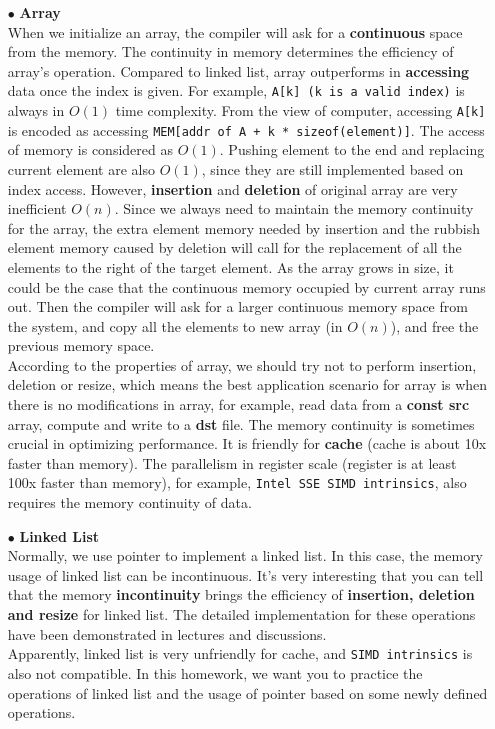 \documentclass[10.5pt]{article}
\begin{document}
\begin{enumerate}
	\item[$\bullet$] \textbf{Array}\\
	When we initialize an array, the compiler will ask for a \textbf{continuous} space from the memory. The continuity in memory determines the efficiency of array's operation. Compared to linked list, array outperforms in \textbf{accessing} data once the index is given. For example, \texttt{A[k] (k is a valid index)} is always in $O(1)$ time complexity. From the view of computer, accessing \texttt{A[k]} is encoded as accessing \texttt{MEM[addr of A + k * sizeof(element)]}. The access of memory is considered as $O(1)$. Pushing element to the end and replacing current element are also $O(1)$, since they are still implemented based on index access. However, \textbf{insertion} and \textbf{deletion} of original array are very inefficient $O(n)$. Since we always need to maintain the memory continuity for the array, the extra element memory needed by insertion and the rubbish element memory caused by deletion will call for the replacement of all the elements to the right of the target element. As the array grows in size, it could be the case that the continuous memory occupied by current array runs out. Then the compiler will ask for a larger continuous memory space from the system, and copy all the elements to new array (in $O(n)$), and free the previous memory space.\\
	
	According to the properties of array, we should try not to perform insertion, deletion or resize, which means the best application scenario for array is when there is no modifications in array, for example, read data from a \textbf{const src} array, compute and write to a \textbf {dst} file. The memory continuity is sometimes crucial in optimizing performance. It is friendly for \textbf{cache} (cache is about 10x faster than memory). The parallelism in register scale (register is at least 100x faster than memory), for example, \texttt{Intel SSE SIMD intrinsics}, also requires the memory continuity of data.\\
	
	\item[$\bullet$] \textbf{Linked List}\\
	Normally, we use pointer to implement a linked list. In this case, the memory usage of linked list can be incontinuous. It's very interesting that you can tell that the memory \textbf{incontinuity} brings the efficiency of \textbf{insertion, deletion and resize} for linked list. The detailed implementation for these operations have been demonstrated in lectures and discussions.\\
	
	 Apparently, linked list is very unfriendly for cache, and \texttt{SIMD intrinsics} is also not compatible. In this homework, we want you to practice the operations of linked list and the usage of pointer based on some newly defined operations. 

	
\end{enumerate}
\pagebreak
\end{document}
